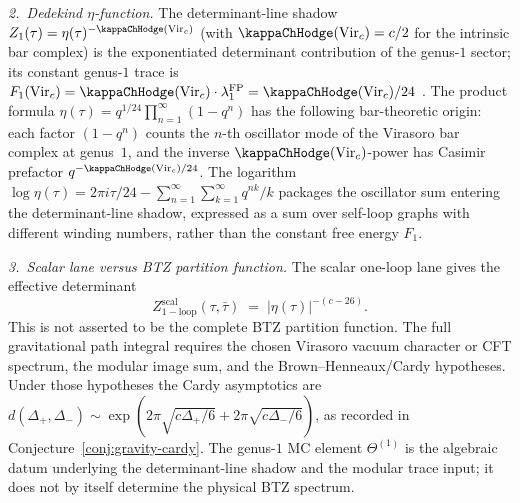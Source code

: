 \emph{2.\ Dedekind $\eta$-function.}
The determinant-line shadow
$Z_1(\tau) = \eta(\tau)^{-\kappaChHodge(\mathrm{Vir}_c)}$
(with $\kappaChHodge(\mathrm{Vir}_c)=c/2$ for the intrinsic bar complex) is
the exponentiated determinant contribution of the genus-$1$
sector; its constant genus-$1$ trace is
$F_1(\mathrm{Vir}_c)
= \kappaChHodge(\mathrm{Vir}_c) \cdot \lambda_1^{\mathrm{FP}}
= \kappaChHodge(\mathrm{Vir}_c)/24$ .
The product formula
$\eta(\tau) = q^{1/24}\prod_{n=1}^\infty(1-q^n)$
has the following bar-theoretic origin: each factor $(1-q^n)$
counts the $n$-th oscillator mode of the Virasoro bar
complex at genus~$1$, and the inverse
\(\kappaChHodge(\mathrm{Vir}_c)\)-power has
Casimir prefactor \(q^{-\kappaChHodge(\mathrm{Vir}_c)/24}\).
The logarithm
$\log\eta(\tau) = 2\pi i\tau/24
- \sum_{n=1}^\infty \sum_{k=1}^\infty q^{nk}/k$
packages the oscillator sum entering the determinant-line shadow, expressed
as a sum over self-loop graphs with different winding
numbers, rather than the constant free energy $F_1$.

\emph{3.\ Scalar lane versus BTZ partition function.}
The scalar one-loop lane gives the effective determinant
\[
Z_{\mathrm{1-loop}}^{\mathrm{scal}}(\tau,\bar\tau)
\;=\;
\bigl|\eta(\tau)\bigr|^{-(c-26)}.
\]
This is not asserted to be the complete BTZ partition function.
The full gravitational path integral requires the chosen Virasoro
vacuum character or CFT spectrum, the modular image sum, and the
Brown--Henneaux/Cardy hypotheses. Under those hypotheses the
Cardy asymptotics are
$d(\Delta_+,\Delta_-) \sim
\exp(2\pi\sqrt{c\Delta_+/6}+
2\pi\sqrt{c\Delta_-/6})$, as recorded in
Conjecture~\ref{conj:gravity-cardy}.
The genus-$1$ MC element $\Theta^{(1)}$ is the algebraic
datum underlying the determinant-line shadow and the modular trace
input; it does not by itself determine the physical BTZ spectrum.

